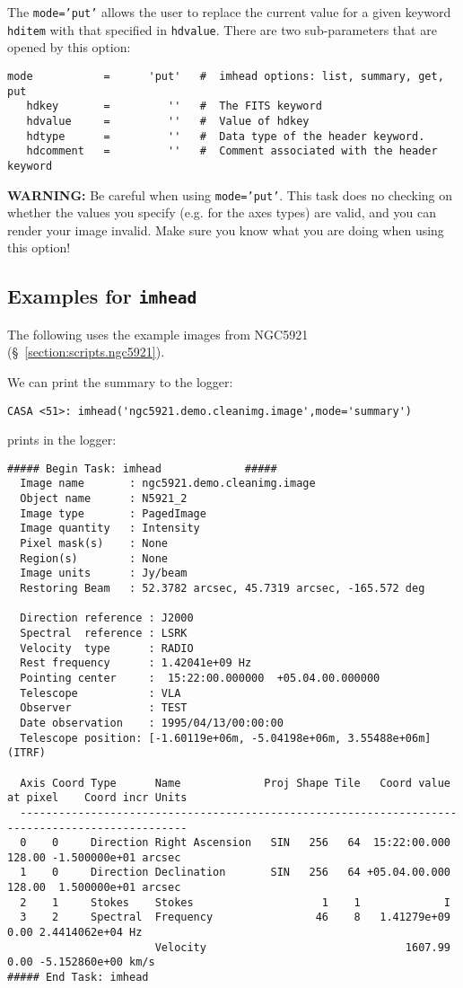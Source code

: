 The {\tt mode='put'} allows the user to replace the current value 
for a given keyword {\tt hditem} with that specified in {\tt hdvalue}.  
There are two sub-parameters that are opened by this option:
\small
\begin{verbatim}
mode           =      'put'   #  imhead options: list, summary, get, put
   hdkey       =         ''   #  The FITS keyword
   hdvalue     =         ''   #  Value of hdkey
   hdtype      =         ''   #  Data type of the header keyword.
   hdcomment   =         ''   #  Comment associated with the header keyword

\end{verbatim}
\normalsize
{\bf WARNING:} Be careful when using {\tt mode='put'}.  This task does
no checking on whether the values you specify (e.g. for the axes
types) are valid, and you can render your image invalid.  Make sure you
know what you are doing when using this option!

\subsection{Examples for {\tt imhead}}
\label{section:analysis.imhead.examples}

The following uses the example images from NGC5921
(\S~\ref{section:scripts.ngc5921}).

We can print the summary to the logger:
\small
\begin{verbatim}
CASA <51>: imhead('ngc5921.demo.cleanimg.image',mode='summary')
\end{verbatim}
\normalsize
prints in the logger: 
\small
\begin{verbatim}
##### Begin Task: imhead             #####
  Image name       : ngc5921.demo.cleanimg.image
  Object name      : N5921_2
  Image type       : PagedImage
  Image quantity   : Intensity
  Pixel mask(s)    : None
  Region(s)        : None
  Image units      : Jy/beam
  Restoring Beam   : 52.3782 arcsec, 45.7319 arcsec, -165.572 deg
  
  Direction reference : J2000
  Spectral  reference : LSRK
  Velocity  type      : RADIO
  Rest frequency      : 1.42041e+09 Hz
  Pointing center     :  15:22:00.000000  +05.04.00.000000
  Telescope           : VLA
  Observer            : TEST
  Date observation    : 1995/04/13/00:00:00
  Telescope position: [-1.60119e+06m, -5.04198e+06m, 3.55488e+06m] (ITRF)
  
  Axis Coord Type      Name             Proj Shape Tile   Coord value at pixel    Coord incr Units
  ------------------------------------------------------------------------------------------------ 
  0    0     Direction Right Ascension   SIN   256   64  15:22:00.000   128.00 -1.500000e+01 arcsec
  1    0     Direction Declination       SIN   256   64 +05.04.00.000   128.00  1.500000e+01 arcsec
  2    1     Stokes    Stokes                    1    1             I
  3    2     Spectral  Frequency                46    8   1.41279e+09     0.00 2.4414062e+04 Hz
                       Velocity                               1607.99     0.00 -5.152860e+00 km/s
##### End Task: imhead           
\end{verbatim}
\normalsize

